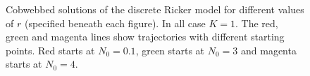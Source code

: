 \documentclass[10pt]{article}
\begin{document}
\begin{Answ}
\begin{enumerate}
\begin{figure}[h!!!tb]
\caption{\label{Ricker_cobweb} Cobwebbed solutions of the discrete Ricker model for different values of $r$ (specified beneath each figure). In all case $K=1$. The red, green and magenta lines show trajectories with different starting points. Red starts at $N_0=0.1$, green starts at $N_0=3$ and magenta starts at $N_0=4$.}
\end{figure}
\end{enumerate}
\end{Answ}
\end{document}
